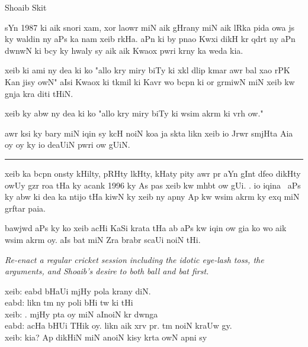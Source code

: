 \documentclass{article}
\begin{document}
\begin{center} \LARGE
	Shoaib Skit
\end{center}

\startUrdu

	sYn 1987 ki aik snori xam, xor laowr miN aik gHrany miN aik lRka pida owa js ky waldin ny aPs ka nam xeib rkHa.
	aPn ki by pnao Kwxi dikH kr qdrt ny aPn dwnwN ki bcy ky hwaly sy aik aik Kwaox pwri krny ka weda kia.


	xeib ki ami ny dea ki ko "allo kry miry biTy ki xkl dlip kmar awr bal xao rPK Kan jisy owN" aIsi Kwaox ki tkmil ki Kavr wo bcpn ki or grmiwN miN xeib kw gnja kra diti tHiN. \hfill {}

	xeib ky abw ny dea ki ko "allo kry miry biTy ki  wsim akrm ki vrh ow."

	awr ksi ky bary miN iqin sy kcH noiN koa ja skta likn xeib io Jrwr smjHta Aia oy oy ky io deaUiN pwri ow gUiN.

\rule{\textwidth}{1pt}

	xeib ka bcpn onsty kHilty, pRHty lkHty,  kHaty pity awr  pr aYn gInt dfeo  dikHty owUy gzr roa tHa ky acank 1996 ky As pas xeib kw mhbt ow gUi.
	.
	io iqina~ aPs ky abw ki dea ka ntijo tHa kiwN ky xeib ny apny Ap kw wsim akrm ky exq miN grftar paia.

	bawjwd aPs ky ko xeib acHi KaSi  krata tHa ab aPs kw iqin ow gia ko wo aik  wsim akrm oy.
	aIs bat miN Zra brabr scaUi noiN tHi.

\begin{enpara}
	\itshape
	Re-enact a regular cricket session including the idotic eye-lash toss, the arguments, and Shoaib's desire to both ball and bat first.
\end{enpara}

	\vspace{0.5\baselineskip}
	xeib:  eabd bHaUi mjHy pola  krany diN.\\
	eabd: likn tm ny poli  bHi tw ki tHi\\
	xeib: . mjHy pta oy miN aInoiN  kr dwnga\\
	eabd: acHa bHUi THik oy.
	likn aik xrv pr.
	tm  noiN kraUw gy.\\
	xeib: kia? Ap dikHiN miN anoiN kisy  krta owN apni  sy
\end{document}
